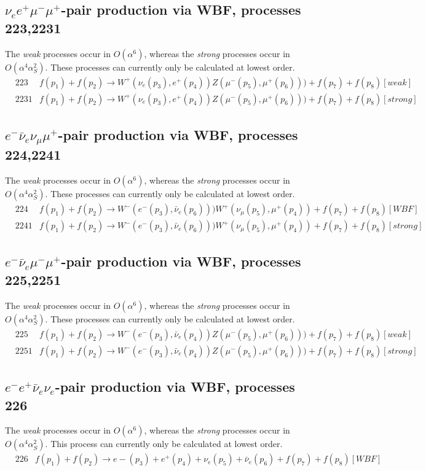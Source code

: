 \subsection{$\nu_e  e^+ \mu^- \mu^+$-pair production via WBF, processes 223,2231}
The {\it weak} processes occur in $O(\alpha^6)$, whereas the {\it strong} processes occur in $O(\alpha^4 \alpha_S^2)$.
These processes can currently only be calculated at lowest order.
\begin{eqnarray}
& 223  & f(p_1)+f(p_2) \to W^+(\nu_e(p_3),e^+(p_4))Z(\mu^-(p_5),\mu^+(p_6)))+f(p_7)+f(p_8) [weak]  \nonumber \\
& 2231 & f(p_1)+f(p_2) \to W^+(\nu_e(p_3),e^+(p_4))Z(\mu^-(p_5),\mu^+(p_6)))+f(p_7)+f(p_8) [strong]  \nonumber
\end{eqnarray}

\subsection{$e^- \bar\nu_{e} \nu_{\mu} \mu^+$-pair production via WBF, processes 224,2241}
The {\it weak} processes occur in $O(\alpha^6)$, whereas the {\it strong} processes occur in $O(\alpha^4 \alpha_S^2)$.
These processes can currently only be calculated at lowest order.
\begin{eqnarray}
&224   & f(p_1)+f(p_2) \to W^-(e^-(p_3),\bar{\nu}_e(p_6)))W^+(\nu_\mu(p_5),\mu^+(p_4))+f(p_7)+f(p_8) [WBF]    \nonumber 
\\
&2241  & f(p_1)+f(p_2) \to W^-(e^-(p_3),\bar{\nu}_e(p_6)))W^+(\nu_\mu(p_5),\mu^+(p_4))+f(p_7)+f(p_8) [strong]  
\nonumber   
\end{eqnarray}
%
\subsection{$e^- \bar\nu_{e} \mu^- \mu^+$-pair production via WBF, processes 225,2251}
The {\it weak} processes occur in $O(\alpha^6)$, whereas the {\it strong} processes occur in $O(\alpha^4 \alpha_S^2)$.
These processes can currently only be calculated at lowest order.
\begin{eqnarray}
&225   & f(p_1)+f(p_2) \to W^-(e^-(p_3),\bar{\nu}_e(p_4))Z(\mu^-(p_5),\mu^+(p_6)))+f(p_7)+f(p_8) [weak]    \nonumber \\
&2251  &  f(p_1)+f(p_2) \to W^-(e^-(p_3),\bar{\nu}_e(p_4))Z(\mu^-(p_5),\mu^+(p_6)))+f(p_7)+f(p_8) [strong]  \nonumber  
\end{eqnarray}


\subsection{$e^- e^+ \bar\nu_{e} \nu_{e}$-pair production via WBF, processes 226}
The {\it weak} processes occur in $O(\alpha^6)$, whereas the {\it strong} processes occur in $O(\alpha^4 \alpha_S^2)$.
This process can currently only be calculated at lowest order.
\begin{eqnarray}
&226  &  f(p_1)+f(p_2) \to e-(p_3)+e^+(p_4)+\nu_e(p_5)+\bar{\nu}_e(p_6)+f(p_7)+f(p_8) [WBF]    \nonumber
\end{eqnarray}

